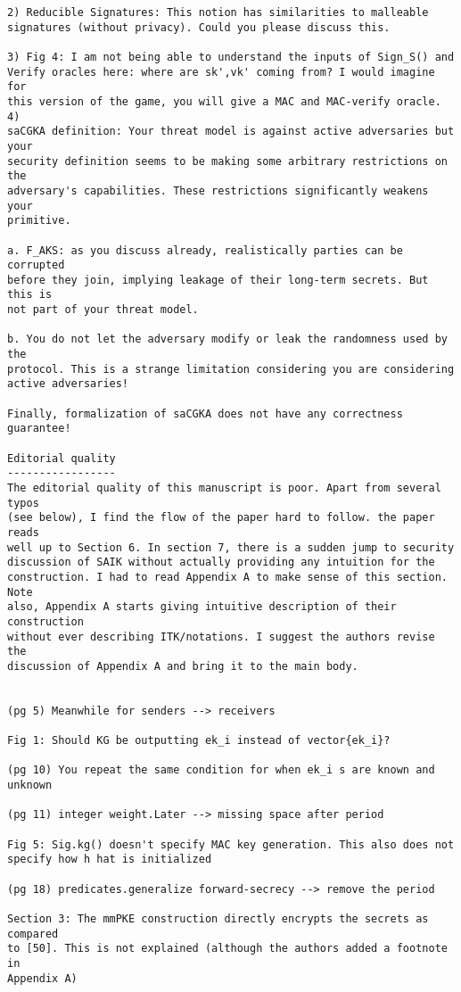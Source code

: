\documentclass[letterpaper,10pt]{article}
\begin{document}
\begin{enumerate}[label=(\Alph*)]
\begin{verbatim}
2) Reducible Signatures: This notion has similarities to malleable
signatures (without privacy). Could you please discuss this.

3) Fig 4: I am not being able to understand the inputs of Sign_S() and
Verify oracles here: where are sk',vk' coming from? I would imagine for
this version of the game, you will give a MAC and MAC-verify oracle. 4)
saCGKA definition: Your threat model is against active adversaries but your
security definition seems to be making some arbitrary restrictions on the
adversary's capabilities. These restrictions significantly weakens your
primitive.

a. F_AKS: as you discuss already, realistically parties can be corrupted
before they join, implying leakage of their long-term secrets. But this is
not part of your threat model.

b. You do not let the adversary modify or leak the randomness used by the
protocol. This is a strange limitation considering you are considering
active adversaries!

Finally, formalization of saCGKA does not have any correctness guarantee!

Editorial quality
-----------------
The editorial quality of this manuscript is poor. Apart from several typos
(see below), I find the flow of the paper hard to follow. the paper reads
well up to Section 6. In section 7, there is a sudden jump to security
discussion of SAIK without actually providing any intuition for the
construction. I had to read Appendix A to make sense of this section. Note
also, Appendix A starts giving intuitive description of their construction
without ever describing ITK/notations. I suggest the authors revise the
discussion of Appendix A and bring it to the main body.


(pg 5) Meanwhile for senders --> receivers

Fig 1: Should KG be outputting ek_i instead of vector{ek_i}?

(pg 10) You repeat the same condition for when ek_i s are known and unknown

(pg 11) integer weight.Later --> missing space after period

Fig 5: Sig.kg() doesn't specify MAC key generation. This also does not
specify how h hat is initialized

(pg 18) predicates.generalize forward-secrecy --> remove the period

Section 3: The mmPKE construction directly encrypts the secrets as compared
to [50]. This is not explained (although the authors added a footnote in
Appendix A)


\end{verbatim}
\end{enumerate}
\end{document}
